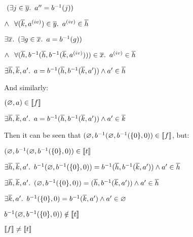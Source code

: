 \begin{itemize}
  \step
    \quad\quad\quad\phantom{$\land$}$~(\exists j\in\overline{y}\ldotp~a^{\prime\prime}=b^{-1}(j))$

  \step
    \quad\quad\quad$\land~\phantom{(}\forall (\overline{k},a^{\text (iv)})\in\overline{y}\ldotp~a^{\text (iv)}\in\overline{h}$
  \addtolength{\itemsep}{.5\baselineskip}

  \step[\iffs]
    $\exists \overline{x}\ldotp~(\exists g\in\overline{x}\ldotp~a = b^{-1}(g))$

  \addtolength{\itemsep}{-.5\baselineskip}
  \step
    \quad $\land~\phantom{(}\forall(\overline{h},b^{-1}(\overline{h},b^{-1}(\overline{k}, a^{\text (iv)})))\in\overline{x}\ldotp~a^{\text (iv)}\in\overline{h}$
  \addtolength{\itemsep}{.5\baselineskip}

  \step[\iffs]
    $\exists\overline{h},\overline{k},a^\prime\ldotp~a = b^{-1}(\overline{h}, b^{-1}(\overline{k},a^\prime))\land a^\prime\in\overline{h}$
\end{itemize}

And similarly:

\begin{itemize}
  \step
    $(\varnothing,a)\in\llbracket f \rrbracket$

  \step[\iffs]
    $\exists\overline{h},\overline{k},a^\prime\ldotp~a = b^{-1}(\overline{h}, b^{-1}(\overline{k},a^\prime))\land a^\prime\in\overline{k}$

\end{itemize}

Then it can be seen that $(\varnothing,b^{-1}(\varnothing,b^{-1}(\{0\},0))\in\llbracket f \rrbracket$, but:
\begin{itemize}
  \step
    $(\varnothing,b^{-1}(\varnothing,b^{-1}(\{0\},0))\in\llbracket t \rrbracket$

  \step[\iffs]
    $\exists\overline{h},\overline{k},a^\prime\ldotp~b^{-1}(\varnothing,b^{-1}(\{0\},0)) = b^{-1}(\overline{h}, b^{-1}(\overline{k},a^\prime))\land a^\prime\in\overline{h}$

  \step[\iffs]
    $\exists\overline{h},\overline{k},a^\prime\ldotp~(\varnothing,b^{-1}(\{0\},0)) = (\overline{h}, b^{-1}(\overline{k},a^\prime))\land a^\prime\in\overline{h}$

  \step[\iffs]
    $\exists\overline{k},a^\prime\ldotp~b^{-1}(\{0\},0) = b^{-1}(\overline{k},a^\prime)\land a^\prime\in\varnothing$

  \step[\imps]
    $b^{-1}(\varnothing,b^{-1}(\{0\},0))\notin\llbracket t \rrbracket$

  \step[\imps]
    $\llbracket f \rrbracket\neq\llbracket t \rrbracket$
\end{itemize}
